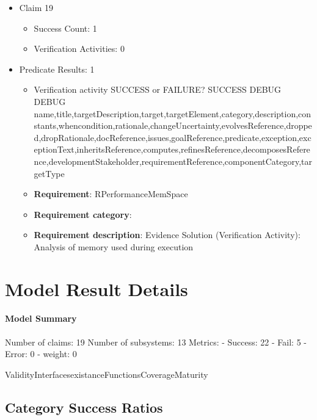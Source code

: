 \documentclass{article}
\begin{document}
\begin{itemize}
  				  \item Claim 19
				\begin{itemize}
			    	\item Success Count: 1 
			    	\item Verification Activities: 0
				\end{itemize}
				
									    
				\item Predicate Results: 1
					\begin{itemize}				
					\item Verification activity SUCCESS or FAILURE? SUCCESS
					DEBUG DEBUG name,title,targetDescription,target,targetElement,category,description,constants,whencondition,rationale,changeUncertainty,evolvesReference,dropped,dropRationale,docReference,issues,goalReference,predicate,exception,exceptionText,inheritsReference,computes,refinesReference,decomposesReference,developmentStakeholder,requirementReference,componentCategory,targetType
					\item \textbf{Requirement}: RPerformanceMemSpace 
					\item \textbf{Requirement category}: 
					\item \textbf{Requirement description}: Evidence Solution (Verification Activity): Analysis of memory used during execution
					\end{itemize}

			\end{itemize}

			\section{Model Result Details} 
			\paragraph{Model Summary}
			Number of claims: 19
			Number of subsystems: 13
			Metrics:
			- Success: 22
			- Fail: 5
			- Error: 0
			- weight: 0
			
			ValidityInterfacesexistanceFunctionsCoverageMaturity

					\subsection{Category Success Ratios}
						
\end{document}

